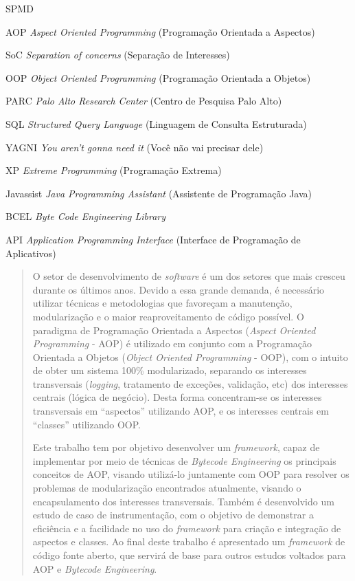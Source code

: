 \documentclass[tc,oneside]{iiufrgs}
\begin{document}
\begin{listofabbrv}{SPMD}
	\item[AOP] \textit{Aspect Oriented Programming} (Programação Orientada a Aspectos)
	\item[SoC] \textit{Separation of concerns} (Separação de Interesses)
	\item[OOP] \textit{Object Oriented Programming} (Programação Orientada a Objetos)
	\item[PARC] \textit{Palo Alto Research Center} (Centro de Pesquisa Palo Alto) 
	\item[SQL] \textit{Structured Query Language} (Linguagem de Consulta Estruturada)
	\item[YAGNI] \textit{You aren’t gonna need it} (Você não vai precisar dele)
	\item[XP] \textit{Extreme Programming} (Programação Extrema)
	\item[Javassist] \textit{Java Programming Assistant} (Assistente de Programação Java)
	\item[BCEL] \textit{Byte Code Engineering Library}
	\item[API] \textit{Application Programming Interface} (Interface de Programação de Aplicativos)
\end{listofabbrv}

\listoffigures

\listoftables

\begin{abstract}

O setor de desenvolvimento de \textit{software} é um dos setores que mais cresceu durante os últimos anos. Devido a essa grande demanda, é necessário utilizar técnicas e metodologias que favoreçam a manutenção, modularização e o maior reaproveitamento de código possível. O paradigma de Programação Orientada a Aspectos (\textit{Aspect Oriented Programming} - AOP) é utilizado em conjunto com a Programação Orientada a Objetos (\textit{Object Oriented Programming} - OOP), com o intuito de obter um sistema 100\% modularizado, separando os interesses transversais (\textit{logging}, tratamento de exceções, validação, etc) dos interesses centrais (lógica de negócio).  Desta forma concentram-se os interesses transversais em “aspectos” utilizando AOP, e os interesses centrais em “classes” utilizando OOP.

Este trabalho tem por objetivo desenvolver um \textit{framework}, capaz de implementar por meio de técnicas de \textit{Bytecode Engineering} os principais conceitos de AOP, visando utilizá-lo  juntamente com OOP para resolver os problemas de modularização encontrados atualmente, visando o encapsulamento dos interesses transversais. Também é desenvolvido um estudo de caso de instrumentação, com o objetivo de demonstrar a eficiência e a facilidade no uso do \textit{framework} para criação e integração de aspectos e classes. Ao final deste trabalho é apresentado um \textit{framework} de código fonte aberto, que servirá de base para outros estudos voltados para AOP e \textit{Bytecode Engineering}.

\end{abstract}
\end{document}
